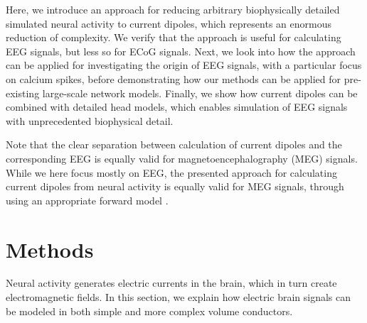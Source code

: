 \documentclass[preprint,10pt,authoryear]{elsarticle}
\newcommand{\hlp}[2][Purple]{ {\sethlcolor{#1} \hl{#2}} }
\newcommand{\sntxt}[1]{{\color{NavyBlue}#1}}
\newcommand{\tvntxt}[1]{{\color{Emerald}#1}}
\newcommand{\gen}[1]{\color{white}{\hlp{GTE: #1 }}\color{black}}
\begin{document}
Here, we introduce an approach for reducing arbitrary biophysically detailed simulated neural activity to current dipoles, \sntxt{which represents an enormous reduction of complexity. We verify that the approach is useful} for calculating EEG signals\sntxt{, but less so for ECoG signals. Next, we look into} how the approach can be applied for investigating the origin of EEG signals, \tvntxt{with a particular focus on calcium spikes,} before demonstrating how our methods can be applied for pre-existing large-scale network models. Finally, we show how current dipoles can be combined with \tvntxt{detailed} head models, which enables simulation of EEG signals with unprecedented biophysical detail.  



\tvntxt{Note that the clear separation between calculation of current dipoles and the corresponding EEG is equally valid for magnetoencephalography (MEG) signals. While we here focus mostly on EEG, the presented approach for calculating current dipoles from neural activity is equally valid for MEG signals, through using an appropriate forward model \citep{Ilmoniemi2019}.}



\section{Methods}\label{sec:methods}
Neural activity generates electric currents in the brain, which in turn create electromagnetic fields. In this section, we explain how electric brain signals can be modeled in both simple and more complex volume conductors.
\end{document}
